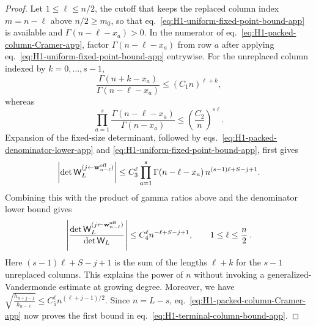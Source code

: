\documentclass[a4paper,11pt]{article}
\theoremstyle{definition}
\theoremstyle{remark}
\begin{document}
\begin{proof}
Let \(1\le\ell\le n/2\), the cutoff that keeps the replaced column index $m=n-\ell$ above
$n/2\ge m_0$, so that eq.~\eqref{eq:H1-uniform-fixed-point-bound-app} is available and
$\Gamma(n-\ell-x_a)>0$. In the numerator of
eq.~\eqref{eq:H1-packed-column-Cramer-app}, factor
\(\Gamma(n-\ell-x_a)\) from row \(a\) after applying
eq.~\eqref{eq:H1-uniform-fixed-point-bound-app} entrywise.
For the unreplaced column indexed by \(k=0,\ldots,s-1\),
\begin{equation}
   \frac{\Gamma(n+k-x_a)}{\Gamma(n-\ell-x_a)}
   \le (C_1n)^{\ell+k},
\end{equation}
whereas
\begin{equation}
   \prod_{a=1}^{s}
   \frac{\Gamma(n-\ell-x_a)}{\Gamma(n-x_a)}
   \le \left(\frac{C_2}{n}\right)^{s\ell}.
\end{equation}
Expansion of the fixed-size determinant, followed by
eqs.~\eqref{eq:H1-packed-denominator-lower-app} and
\eqref{eq:H1-uniform-fixed-point-bound-app}, first gives
\begin{equation}
   \left|
      \det\mathsf W_L^{(j\leftarrow\mathbf w_{n-\ell}^{\rm off})}
   \right|
   \le
   C_3^\ell
   \prod_{a=1}^{s}\Gamma(n-\ell-x_a)\,
   n^{(s-1)\ell+S-j+1}.
   \label{eq:H1-packed-numerator-uniform-bound-app}
\end{equation}
Combining this with the product of gamma ratios above and the
denominator lower bound gives
\begin{equation}
   \left|
   \frac{
      \det\mathsf W_L^{(j\leftarrow\mathbf w_{n-\ell}^{\rm off})}
   }{\det\mathsf W_L}
   \right|
   \le
   C_4^\ell n^{-\ell+S-j+1},
   \qquad 1\le\ell\le\frac n2\,.
   \label{eq:H1-packed-unnormalized-ratio-app}
\end{equation}
Here \((s-1)\ell+S-j+1\) is the sum of the lengths
\(\ell+k\) for the \(s-1\) unreplaced columns. This explains the power
of \(n\) without invoking a generalized-Vandermonde estimate at growing
degree. Moreover, we have
\(
   \sqrt{\frac{h_{n+j-1}}{h_{n-\ell}}}
   \le C_5^\ell n^{(\ell+j-1)/2}.
\)
Since \(n=L-s\), eq.~\eqref{eq:H1-packed-column-Cramer-app} now proves
the first bound in eq.~\eqref{eq:H1-terminal-column-bound-app}.


\end{proof}
\end{document}

